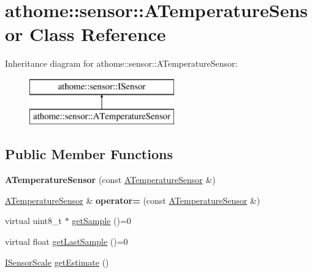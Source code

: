 \hypertarget{classathome_1_1sensor_1_1_a_temperature_sensor}{}\section{athome\+:\+:sensor\+:\+:A\+Temperature\+Sensor Class Reference}
\label{classathome_1_1sensor_1_1_a_temperature_sensor}
Inheritance diagram for athome\+:\+:sensor\+:\+:A\+Temperature\+Sensor\+:\begin{figure}[H]
\begin{center}
\leavevmode
\includegraphics[height=2.000000cm]{classathome_1_1sensor_1_1_a_temperature_sensor}
\end{center}
\end{figure}
\subsection*{Public Member Functions}
\begin{DoxyCompactItemize}
\item 
\mbox{\label{classathome_1_1sensor_1_1_a_temperature_sensor_aaa9200af64455f375e0cc2284ab856e2}} 
{\bfseries A\+Temperature\+Sensor} (const \mbox{\hyperlink{classathome_1_1sensor_1_1_a_temperature_sensor}{A\+Temperature\+Sensor}} \&)
\item 
\mbox{\label{classathome_1_1sensor_1_1_a_temperature_sensor_a171dca820ce036eb24e305494d2c4654}} 
\mbox{\hyperlink{classathome_1_1sensor_1_1_a_temperature_sensor}{A\+Temperature\+Sensor}} \& {\bfseries operator=} (const \mbox{\hyperlink{classathome_1_1sensor_1_1_a_temperature_sensor}{A\+Temperature\+Sensor}} \&)
\item 
virtual uint8\+\_\+t $\ast$ \mbox{\hyperlink{classathome_1_1sensor_1_1_a_temperature_sensor_a397794217f3163950add6d28f69a6202}{get\+Sample}} ()=0
\item 
virtual float \mbox{\hyperlink{classathome_1_1sensor_1_1_a_temperature_sensor_a2f1833f5fac81baed80f75583a86491d}{get\+Last\+Sample}} ()=0
\item 
\mbox{\hyperlink{classathome_1_1sensor_1_1_i_sensor_aa70bc27a4c17c86caf96cca776541ddf}{I\+Sensor\+Scale}} \mbox{\hyperlink{classathome_1_1sensor_1_1_a_temperature_sensor_a3997ff080f6a9e444c52a63f1b40d73c}{get\+Estimate}} ()
\end{DoxyCompactItemize}
